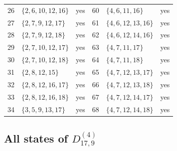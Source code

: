 \documentclass[aps,pra,reprint,superscriptaddress,longbibliography,nofootinbib,floatfix,10pt]{revtex4-2}
\theoremstyle{definition}
\begin{document}
\begin{longtable}{rlc@{\qquad}rlc}
26 & $\{2,\allowbreak 6,\allowbreak 10,\allowbreak 12,\allowbreak 16\}$ & yes & 60 & $\{4,\allowbreak 6,\allowbreak 11,\allowbreak 16\}$ & yes\\
27 & $\{2,\allowbreak 7,\allowbreak 9,\allowbreak 12,\allowbreak 17\}$ & yes & 61 & $\{4,\allowbreak 6,\allowbreak 12,\allowbreak 13,\allowbreak 16\}$ & yes\\
28 & $\{2,\allowbreak 7,\allowbreak 9,\allowbreak 12,\allowbreak 18\}$ & yes & 62 & $\{4,\allowbreak 6,\allowbreak 12,\allowbreak 14,\allowbreak 16\}$ & yes\\
29 & $\{2,\allowbreak 7,\allowbreak 10,\allowbreak 12,\allowbreak 17\}$ & yes & 63 & $\{4,\allowbreak 7,\allowbreak 11,\allowbreak 17\}$ & yes\\
30 & $\{2,\allowbreak 7,\allowbreak 10,\allowbreak 12,\allowbreak 18\}$ & yes & 64 & $\{4,\allowbreak 7,\allowbreak 11,\allowbreak 18\}$ & yes\\
31 & $\{2,\allowbreak 8,\allowbreak 12,\allowbreak 15\}$ & yes & 65 & $\{4,\allowbreak 7,\allowbreak 12,\allowbreak 13,\allowbreak 17\}$ & yes\\
32 & $\{2,\allowbreak 8,\allowbreak 12,\allowbreak 16,\allowbreak 17\}$ & yes & 66 & $\{4,\allowbreak 7,\allowbreak 12,\allowbreak 13,\allowbreak 18\}$ & yes\\
33 & $\{2,\allowbreak 8,\allowbreak 12,\allowbreak 16,\allowbreak 18\}$ & yes & 67 & $\{4,\allowbreak 7,\allowbreak 12,\allowbreak 14,\allowbreak 17\}$ & yes\\
34 & $\{3,\allowbreak 5,\allowbreak 9,\allowbreak 13,\allowbreak 17\}$ & yes & 68 & $\{4,\allowbreak 7,\allowbreak 12,\allowbreak 14,\allowbreak 18\}$ & yes\\
\end{longtable}\endgroup
{}\subsection{All states of \texorpdfstring{$D_{17,9}^{(4)}$}{gadget 4e}}
\begingroup\footnotesize\setlength{\tabcolsep}{3pt}\setlength{\LTpre}{5pt}\setlength{\LTpost}{8pt}
\end{document}
